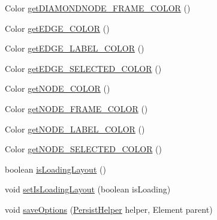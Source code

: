 \begin{DoxyCompactItemize}
\item 
Color \hyperlink{classorg_1_1tzi_1_1use_1_1gui_1_1views_1_1diagrams_1_1_diagram_options_a99af8d5c7200c53dc74680d1a211de09}{get\-D\-I\-A\-M\-O\-N\-D\-N\-O\-D\-E\-\_\-\-F\-R\-A\-M\-E\-\_\-\-C\-O\-L\-O\-R} ()
\item 
Color \hyperlink{classorg_1_1tzi_1_1use_1_1gui_1_1views_1_1diagrams_1_1_diagram_options_af32115528c8134de336a755b363d0930}{get\-E\-D\-G\-E\-\_\-\-C\-O\-L\-O\-R} ()
\item 
Color \hyperlink{classorg_1_1tzi_1_1use_1_1gui_1_1views_1_1diagrams_1_1_diagram_options_ad728caa13fd8ed26c8577efa7c49ae8c}{get\-E\-D\-G\-E\-\_\-\-L\-A\-B\-E\-L\-\_\-\-C\-O\-L\-O\-R} ()
\item 
Color \hyperlink{classorg_1_1tzi_1_1use_1_1gui_1_1views_1_1diagrams_1_1_diagram_options_aa3edac4b4c4777c9ee13c96ab7d6a6ce}{get\-E\-D\-G\-E\-\_\-\-S\-E\-L\-E\-C\-T\-E\-D\-\_\-\-C\-O\-L\-O\-R} ()
\item 
Color \hyperlink{classorg_1_1tzi_1_1use_1_1gui_1_1views_1_1diagrams_1_1_diagram_options_a6dd004ce9c2567b0a04e8ea2d0cbb1e3}{get\-N\-O\-D\-E\-\_\-\-C\-O\-L\-O\-R} ()
\item 
Color \hyperlink{classorg_1_1tzi_1_1use_1_1gui_1_1views_1_1diagrams_1_1_diagram_options_ac257027ec9756d53d482a01d049e1c16}{get\-N\-O\-D\-E\-\_\-\-F\-R\-A\-M\-E\-\_\-\-C\-O\-L\-O\-R} ()
\item 
Color \hyperlink{classorg_1_1tzi_1_1use_1_1gui_1_1views_1_1diagrams_1_1_diagram_options_aa1ae265e1a8f672048b107100eb6a86d}{get\-N\-O\-D\-E\-\_\-\-L\-A\-B\-E\-L\-\_\-\-C\-O\-L\-O\-R} ()
\item 
Color \hyperlink{classorg_1_1tzi_1_1use_1_1gui_1_1views_1_1diagrams_1_1_diagram_options_a2d7c586e21757e30599b27645a52ae17}{get\-N\-O\-D\-E\-\_\-\-S\-E\-L\-E\-C\-T\-E\-D\-\_\-\-C\-O\-L\-O\-R} ()
\item 
boolean \hyperlink{classorg_1_1tzi_1_1use_1_1gui_1_1views_1_1diagrams_1_1_diagram_options_a056848180bccd508ad64d59c1f96df3b}{is\-Loading\-Layout} ()
\item 
void \hyperlink{classorg_1_1tzi_1_1use_1_1gui_1_1views_1_1diagrams_1_1_diagram_options_adf06b0524cf70419521474129c38f52d}{set\-Is\-Loading\-Layout} (boolean is\-Loading)
\item 
void \hyperlink{classorg_1_1tzi_1_1use_1_1gui_1_1views_1_1diagrams_1_1_diagram_options_a6a36242adc509c2f75cdd689dac34872}{save\-Options} (\hyperlink{classorg_1_1tzi_1_1use_1_1gui_1_1util_1_1_persist_helper}{Persist\-Helper} helper, Element parent)
\item 

\end{DoxyCompactItemize}
